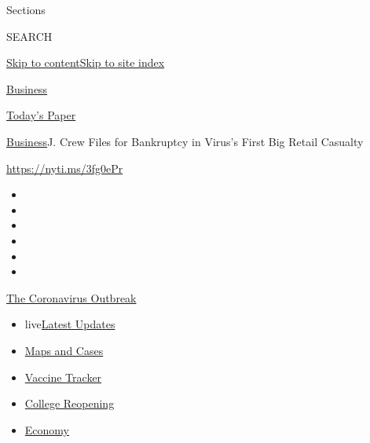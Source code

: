 Sections

SEARCH

\protect\hyperlink{site-content}{Skip to
content}\protect\hyperlink{site-index}{Skip to site index}

\href{https://www.nytimes3xbfgragh.onion/section/business}{Business}

\href{https://myaccount.nytimes3xbfgragh.onion/auth/login?response_type=cookie\&client_id=vi}{}

\href{https://www.nytimes3xbfgragh.onion/section/todayspaper}{Today's
Paper}

\href{/section/business}{Business}\textbar{}J. Crew Files for Bankruptcy
in Virus's First Big Retail Casualty

\url{https://nyti.ms/3fg0ePr}

\begin{itemize}
\item
\item
\item
\item
\item
\item
\end{itemize}

\href{https://www.nytimes3xbfgragh.onion/news-event/coronavirus?action=click\&pgtype=Article\&state=default\&region=TOP_BANNER\&context=storylines_menu}{The
Coronavirus Outbreak}

\begin{itemize}
\tightlist
\item
  live\href{https://www.nytimes3xbfgragh.onion/2020/08/03/world/coronavirus-covid-19.html?action=click\&pgtype=Article\&state=default\&region=TOP_BANNER\&context=storylines_menu}{Latest
  Updates}
\item
  \href{https://www.nytimes3xbfgragh.onion/interactive/2020/us/coronavirus-us-cases.html?action=click\&pgtype=Article\&state=default\&region=TOP_BANNER\&context=storylines_menu}{Maps
  and Cases}
\item
  \href{https://www.nytimes3xbfgragh.onion/interactive/2020/science/coronavirus-vaccine-tracker.html?action=click\&pgtype=Article\&state=default\&region=TOP_BANNER\&context=storylines_menu}{Vaccine
  Tracker}
\item
  \href{https://www.nytimes3xbfgragh.onion/2020/08/02/us/covid-college-reopening.html?action=click\&pgtype=Article\&state=default\&region=TOP_BANNER\&context=storylines_menu}{College
  Reopening}
\item
  \href{https://www.nytimes3xbfgragh.onion/live/2020/08/03/business/stock-market-today-coronavirus?action=click\&pgtype=Article\&state=default\&region=TOP_BANNER\&context=storylines_menu}{Economy}
\end{itemize}

